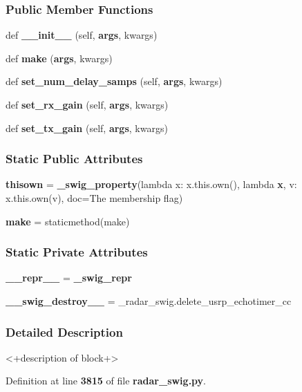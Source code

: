 \subsubsection*{Public Member Functions}
\begin{DoxyCompactItemize}
\item 
def {\bf \+\_\+\+\_\+init\+\_\+\+\_\+} (self, {\bf args}, kwargs)
\item 
def {\bf make} ({\bf args}, kwargs)
\item 
def {\bf set\+\_\+num\+\_\+delay\+\_\+samps} (self, {\bf args}, kwargs)
\item 
def {\bf set\+\_\+rx\+\_\+gain} (self, {\bf args}, kwargs)
\item 
def {\bf set\+\_\+tx\+\_\+gain} (self, {\bf args}, kwargs)
\end{DoxyCompactItemize}
\subsubsection*{Static Public Attributes}
\begin{DoxyCompactItemize}
\item 
{\bf thisown} = {\bf \+\_\+swig\+\_\+property}(lambda x\+: x.\+this.\+own(), lambda {\bf x}, v\+: x.\+this.\+own(v), doc=\textquotesingle{}The membership flag\textquotesingle{})
\item 
{\bf make} = staticmethod(make)
\end{DoxyCompactItemize}
\subsubsection*{Static Private Attributes}
\begin{DoxyCompactItemize}
\item 
{\bf \+\_\+\+\_\+repr\+\_\+\+\_\+} = {\bf \+\_\+swig\+\_\+repr}
\item 
{\bf \+\_\+\+\_\+swig\+\_\+destroy\+\_\+\+\_\+} = \+\_\+radar\+\_\+swig.\+delete\+\_\+usrp\+\_\+echotimer\+\_\+cc
\end{DoxyCompactItemize}


\subsubsection{Detailed Description}
\begin{DoxyVerb}<+description of block+>\end{DoxyVerb}
 

Definition at line {\bf 3815} of file {\bf radar\+\_\+swig.\+py}.



